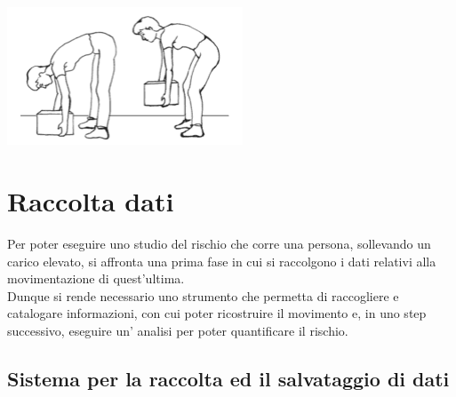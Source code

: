 \documentclass[a4paper, oneside]{book}
\begin{document}
\begin{center}
\begin{minipage}{0.48\linewidth}
\begin{center}
\includegraphics[width=70mm,scale=0.7]{./images/sollevamento_scorretto.png} 
\vspace{3mm}
\end{center}
\end{minipage}
\end{center}




	\clearpage

	\chapter{Raccolta dati}
Per poter eseguire uno studio del rischio che corre una persona, sollevando un carico elevato, si affronta una prima fase in cui si raccolgono i dati relativi alla movimentazione di quest'ultima. \\
Dunque si rende necessario uno strumento che permetta di raccogliere e catalogare informazioni, con cui poter ricostruire il movimento e, in uno step successivo, eseguire un' analisi per poter quantificare il rischio. \\



	\section{Sistema per la raccolta ed il salvataggio di dati}
\end{document}

